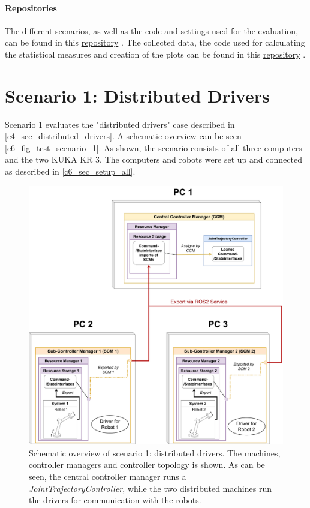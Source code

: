 \paragraph{Repositories}
The different scenarios, as well as the code and settings used for the evaluation, can be found in this  \href{https://github.com/StoglRobotics-forks/ma_demos}{repository} \cite{noauthor_ma_demos_2023}.\newline
The collected data, the code used for calculating the statistical measures and creation of the plots can be found in this \href{https://github.com/mamueluth/ma_evaluation}{repository} \cite{muth_mamueluthma_evaluation_2023}.

\section{Scenario 1: Distributed Drivers}
Scenario 1 evaluates the "distributed drivers" case described in \autoref{c4_sec_distributed_drivers}. A schematic overview can be seen \autoref{c6_fig_test_scenario_1}. As shown, the scenario consists of all three computers and the two KUKA KR 3. The computers and robots were set up and connected as described in \autoref{c6_sec_setup_all}.\newline
\begin{figure}[H]
	\centering
	\includegraphics[width=1\textwidth]{Figures/c6/test_scenario_1.pdf}
	\caption{Schematic overview of scenario 1: distributed drivers. The machines, controller managers and controller topology is shown. As can be seen, the central controller manager runs a \textit{JointTrajectoryController}, while the two distributed machines run the drivers for communication with the robots. }
	\label{c6_fig_test_scenario_1}
\end{figure}
